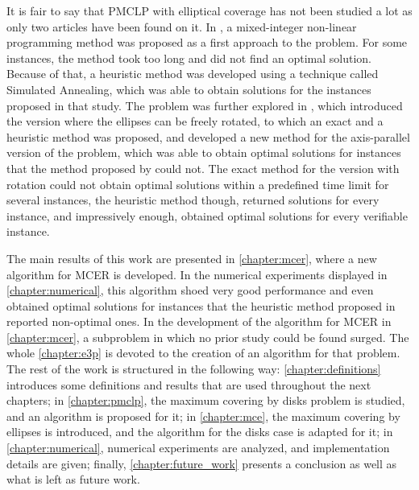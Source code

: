 It is fair to say that PMCLP with elliptical coverage has not been studied a lot as only two articles have been found on it. In , a mixed-integer non-linear programming method was proposed as a first approach to the problem. For some instances, the method took too long and did not find an optimal solution. Because of that, a heuristic method was developed using a technique called Simulated Annealing, which was able to obtain solutions for the instances proposed in that study.
The problem was further explored in , which introduced the version where the ellipses can be freely rotated, to which an exact and a heuristic method was proposed, and developed a new method for the axis-parallel version of the problem, which was able to obtain optimal solutions for instances that the method proposed by  could not.
The exact method for the version with rotation could not obtain optimal solutions within a predefined time limit for several instances, the heuristic method though, returned solutions for every instance, and impressively enough, obtained optimal solutions for every verifiable instance.


The main results of this work are presented in \autoref{chapter:mcer}, where a new algorithm for MCER is developed. 
In the numerical experiments displayed in \autoref{chapter:numerical}, this algorithm shoed very good performance and even obtained optimal solutions for instances that the heuristic method proposed in  reported non-optimal ones. 
In the development of the algorithm for MCER in \autoref{chapter:mcer}, a subproblem in which no prior study could be found surged. The whole \autoref{chapter:e3p} is devoted to the creation of an algorithm for that problem.
The rest of the work is structured in the following way: \autoref{chapter:definitions} introduces some definitions and results that are used throughout the next chapters; in \autoref{chapter:pmclp}, the maximum covering by disks problem is studied, and an algorithm is proposed for it; in \autoref{chapter:mce}, the maximum covering by ellipses is introduced, and the algorithm for the disks case is adapted for it; in \autoref{chapter:numerical}, numerical experiments are analyzed, and implementation details are given; finally, \autoref{chapter:future_work} presents a conclusion as well as what is left as future work.

